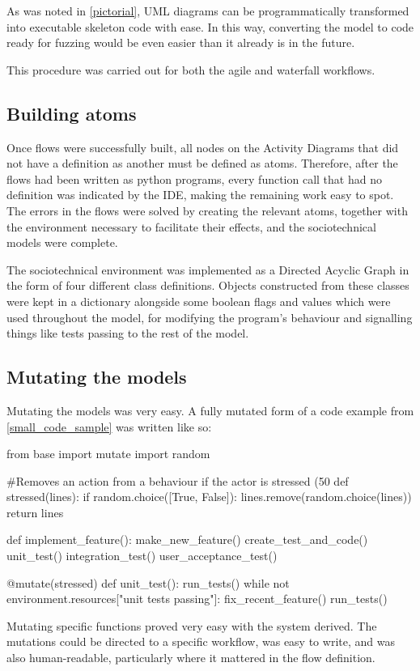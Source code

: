 As was noted in \cref{pictorial}, UML diagrams can be programmatically transformed into executable skeleton code with ease. In this way, converting the model to code ready for fuzzing would be even easier than it already is in the future. \par






This procedure was carried out for both the agile and waterfall workflows. 

\subsection{Building atoms}
Once flows were successfully built, all nodes on the Activity Diagrams that did not have a definition as another must be defined as atoms. Therefore, after the flows had been written as python programs, every function call that had no definition was indicated by the IDE, making the remaining work easy to spot. The errors in the flows were solved by creating the relevant atoms, together with the environment necessary to facilitate their effects, and the sociotechnical models were complete. \par

The sociotechnical environment was implemented as a Directed Acyclic Graph in the form of four different class definitions. Objects constructed from these classes were kept in a dictionary alongside some boolean flags and values which were used throughout the model, for modifying the program's behaviour and signalling things like tests passing to the rest of the model. \par

\subsection{Mutating the models}
Mutating the models was very easy. A fully mutated form of a code example from \cref{small_code_sample} was written like so:

\begin{pyglist}[language = python, encoding = utf8]
from base import mutate
import random

#Removes an action from a behaviour if the actor is stressed (50%
def stressed(lines):
    if random.choice([True, False]):
        lines.remove(random.choice(lines))
    return lines
    

def implement_feature():
    make_new_feature()
    create_test_and_code()
    unit_test()
    integration_test()
    user_acceptance_test()

@mutate(stressed)
def unit_test():
    run_tests()
    while not environment.resources["unit tests passing"]:
        fix_recent_feature()
        run_tests()
\end{pyglist}\par
Mutating specific functions proved very easy with the system derived. The mutations could be directed to a specific workflow, was easy to write, and was also human-readable, particularly where it mattered in the flow definition.\par

